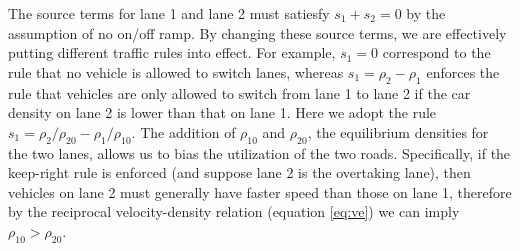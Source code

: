 	The source terms for lane 1 and lane 2 must satiesfy  $s_1+s_2=0$ by the assumption of no on/off ramp. By changing these source terms, we are effectively putting different traffic rules into effect. For example, $s_1=0$ correspond to the rule that no vehicle is allowed to switch lanes, whereas $s_1= \rho_2-\rho_1$ enforces the rule that vehicles are only allowed to switch from lane 1 to lane 2 if the car density on lane 2 is lower than that on lane 1. Here we adopt the rule $s_1=\rho_2/\rho_{20}-\rho_1/\rho_{10}$. The addition of $\rho_{10}$ and $\rho_{20}$, the equilibrium densities for the two lanes, allows us to bias the utilization of the two roads. Specifically, if the keep-right rule is enforced (and suppose lane 2 is the overtaking lane), then vehicles on lane 2 must generally have faster speed than those on lane 1, therefore by the reciprocal velocity-density relation (equation \ref{eq:ve}) we can imply $\rho_{10}>\rho_{20}$.
		
